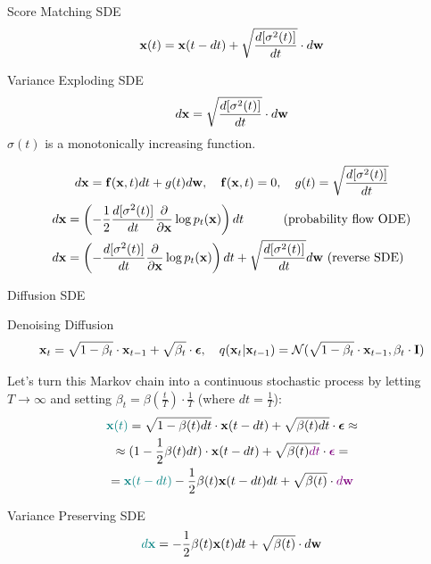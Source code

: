 \documentclass{beamer}
\begin{document}
\begin{frame}{Score Matching SDE}
	\vspace{-0.3cm}
	\[
		\mathbf{x}(t) = \mathbf{x}(t - dt) + \sqrt{\frac{ d [\sigma^2(t)]}{dt}} \cdot d \mathbf{w}
	\]
	\vspace{-0.5cm}
	\begin{block}{Variance Exploding SDE}
		\vspace{-0.3cm}
		\[
			d \mathbf{x} = \sqrt{\frac{ d [\sigma^2(t)]}{dt}} \cdot d \mathbf{w}
		\]
		$\sigma(t)$ is a monotonically increasing function.
	\end{block}
	\vspace{-0.7cm}
	\[
		d\mathbf{x} = \mathbf{f}(\mathbf{x}, t) dt + g(t) d \mathbf{w}, \quad \mathbf{f}(\mathbf{x}, t) = 0, \quad g(t) = \sqrt{\frac{ d [\sigma^2(t)]}{dt}} 
	\]
	\vspace{-0.5cm}
	\begin{align*}
		d\mathbf{x} &= \left(-\frac{1}{2} \frac{ d [\sigma^2(t)]}{dt} \frac{\partial}{\partial \mathbf{x}} \log p_t(\mathbf{x}) \right) dt \qquad\quad\, \text{(probability flow ODE)} \\
		d\mathbf{x} &= \left(- \frac{ d [\sigma^2(t)]}{dt} \frac{\partial}{\partial \mathbf{x}}\log p_t(\mathbf{x})\right) dt + \sqrt{\frac{ d [\sigma^2(t)]}{dt}}  d \mathbf{w} \ \text{(reverse SDE)}
	\end{align*}
\end{frame}
\begin{frame}{Diffusion SDE}
	\begin{block}{Denoising Diffusion}
		\vspace{-0.7cm}
		\[
			\mathbf{x}_t = \sqrt{1 - \beta_t} \cdot \mathbf{x}_{t - 1} + \sqrt{\beta_t} \cdot \boldsymbol{\epsilon}, \quad q(\mathbf{x}_t | \mathbf{x}_{t-1}) = \mathcal{N}(\sqrt{1 - \beta_t} \cdot \mathbf{x}_{t-1}, \beta_t \cdot \mathbf{I})
		\]
		\vspace{-0.7cm}
	\end{block}
	Let's turn this Markov chain into a continuous stochastic process by letting $T \rightarrow \infty$ and setting $\beta_t = \beta(\frac{t}{T}) \cdot \frac{1}{T}$ (where $dt = \frac{1}{T}$):
	\begin{multline*}
		{\color{teal}\mathbf{x}(t)} = \sqrt{1 - \beta(t) dt} \cdot \mathbf{x}(t - dt) + \sqrt{\beta(t)dt} \cdot \boldsymbol{\epsilon} \approx \\
		\approx (1 - \frac{1}{2} \beta(t) dt) \cdot \mathbf{x}(t - dt) + \sqrt{\beta(t){\color{violet}dt}} \cdot {\color{violet}\boldsymbol{\epsilon}} = \\
		= {\color{teal}\mathbf{x}(t - dt)} - \frac{1}{2} \beta(t) \mathbf{x}(t - dt) dt  + \sqrt{\beta(t)} \cdot {\color{violet}d \mathbf{w}}
	\end{multline*}
	\vspace{-0.5cm}
	\begin{block}{Variance Preserving SDE}
		\vspace{-0.3cm}
		\[
			{\color{teal}d \mathbf{x}} = - \frac{1}{2} \beta(t) \mathbf{x}(t) dt + \sqrt{\beta(t)} \cdot d \mathbf{w}
		\]
	\end{block}
\end{frame}
\end{document}
